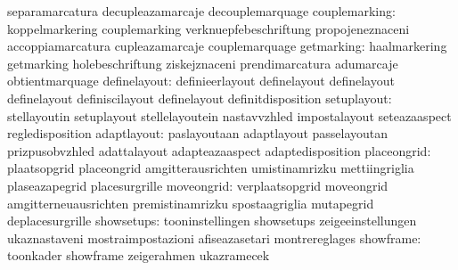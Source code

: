                                   separamarcatura                  decupleazamarcaje
                                  decouplemarquage
                   couplemarking: koppelmarkering                  couplemarking
                                  verknuepfebeschriftung           propojeneznaceni
                                  accoppiamarcatura                cupleazamarcaje
                                  couplemarquage
                      getmarking: haalmarkering                    getmarking
                                  holebeschriftung                 ziskejznaceni
                                  prendimarcatura                  adumarcaje
                                  obtientmarquage
                    definelayout: definieerlayout                  definelayout
                                  definelayout                     definelayout
                                  definiscilayout                  definelayout
                                  definitdisposition
                     setuplayout: stellayoutin                     setuplayout
                                  stellelayoutein                  nastavvzhled
                                  impostalayout                    seteazaaspect
                                  regledisposition
                     adaptlayout: paslayoutaan                     adaptlayout
                                  passelayoutan                    prizpusobvzhled
                                  adattalayout                     adapteazaaspect
                                  adaptedisposition
                     placeongrid: plaatsopgrid                     placeongrid
                                  amgitterausrichten               umistinamrizku
                                  mettiingriglia                   plaseazapegrid
                                  placesurgrille
                      moveongrid: verplaatsopgrid                  moveongrid
                                  amgitterneuausrichten            premistinamrizku
                                  spostaagriglia                   mutapegrid
                                  deplacesurgrille
                      showsetups: tooninstellingen                 showsetups
                                  zeigeeinstellungen               ukaznastaveni
                                  mostraimpostazioni               afiseazasetari
                                  montrereglages
                       showframe: toonkader                        showframe
                                  zeigerahmen                      ukazramecek
